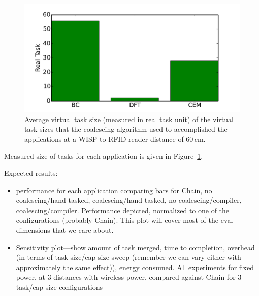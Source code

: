 \begin{figure}
	\centering
	\includegraphics[width=\columnwidth]{figures/averageVirtualTaskSize}
	\caption{Average virtual task size (measured in real task unit) of the virtual task sizes that the coalescing algorithm used to accomplished the applications at a WISP to RFID reader distance of 60\,cm.}
	\label{fig:aveVirtuTaskSize}
\end{figure}

Measured size of tasks for each application is given in Figure~\ref{fig:aveVirtuTaskSize}.

Expected results:
\begin{itemize}
	\item performance for each application comparing bars for Chain, no coalescing/hand-tasked, coalescing/hand-tasked, no-coalescing/compiler, coalescing/compiler. Performance depicted, normalized to one of the configurations (probably Chain). This plot will cover most of the eval dimensions that we care about.
	\item Sensitivity plot---show amount of task merged, time to completion, overhead (in terms of task-size/cap-size sweep (remember we can vary either with approximately the same effect)), energy consumed. All experiments for fixed power, at 3 distances with wireless power, compared against Chain for 3 task/cap size configurations
\end{itemize} 




